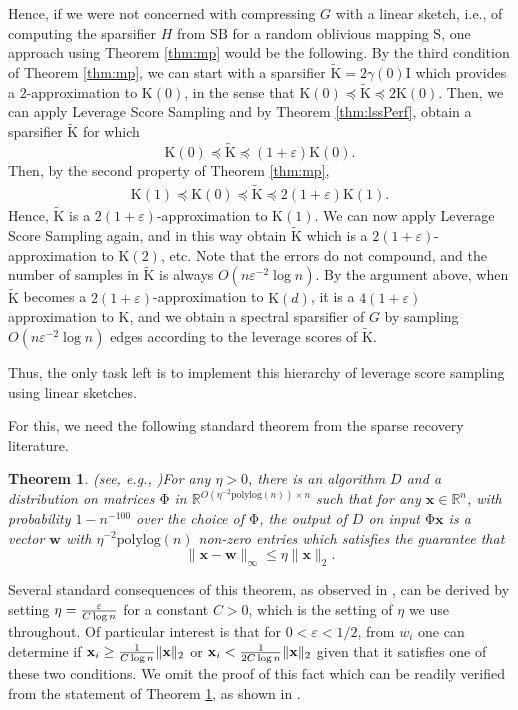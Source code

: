 \documentclass[11pt]{article}
\newtheorem{theorem}{Theorem}
\newcommand{\mat}[1]{{\ensuremath{\bm{\mathrm{#1}}}}}
\def\matB{\mat{B}}
\def\matI{\mat{I}}
\def\matK{\mat{K}}
\def\matS{\mat{S}}
\def\w{{\mathbf{w}}}
\def\frac#1#2{{#1\over #2}}
\def\x{{\mathbf x}}
\newcommand{\eps}{\varepsilon}
\newcommand{\polylog}{{\mathrm{polylog}}}
\begin{document}
Hence, if we were not concerned with compressing $G$ with a linear sketch, i.e., 
of computing the sparsifier $H$ from $\matS \matB$ for a random oblivious
mapping $\matS$, one approach using
Theorem \ref{thm:mp} would be the following. By the third condition of Theorem \ref{thm:mp}, 
we can start with a sparsifier $\tilde{\matK} = 2 \gamma(0)\matI$ which provides a $2$-approximation to $\matK(0)$, 
in the sense that $\matK(0) \preceq \tilde{\matK} \preceq 2\matK(0)$. Then, we can apply Leverage Score Sampling
and by Theorem \ref{thm:lssPerf}, obtain a sparsifier $\tilde{\matK}$ for which 
$$\matK(0) \preceq \tilde{\matK} \preceq (1+\eps)\matK(0).$$
Then, by the second property of Theorem \ref{thm:mp}, 
\begin{eqnarray*}
\matK(1) \preceq \matK(0) \preceq \tilde{\matK} \preceq 2(1+\eps)\matK(1).
\end{eqnarray*}
Hence, $\tilde{\matK}$ is a $2(1+\eps)$-approximation to $\matK(1)$. We can now apply Leverage Score Sampling
again, and in this way obtain $\tilde{\matK}$ which is a $2(1+\eps)$-approximation to $\matK(2)$, etc. Note that
the errors do not compound, and the number of samples in $\tilde{\matK}$ is always $O(n \eps^{-2} \log n)$. By
the argument above, when $\tilde{\matK}$ becomes a $2(1+\eps)$-approximation to $\matK(d)$, it is a $4(1+\eps)$
approximation to $\matK$, and we obtain a spectral sparsifier of $G$ by sampling $O(n \eps^{-2} \log n)$ edges
according to the leverage scores of $\tilde{\matK}$. 

Thus, the only task left is to implement this hierarchy of leverage score sampling using linear sketches. 

For this, we need the following standard theorem from the sparse recovery literature. 
\begin{theorem}(see, e.g., \cite{ccf04,GLPS})\label{thm:hh}
For any $\eta > 0$, there is an algorithm $D$ and a 
distribution on matrices $\mat\Phi$ in $\mathbb{R}^{O(\eta^{-2} \polylog(n)) \times n}$
such that for any $\x \in \mathbb{R}^n$, with probability $1-n^{-100}$ over the choice of $\mat\Phi$, the output of
$D$ on input $\mat\Phi \x$ is a vector $\w$ with $\eta^{-2} \polylog(n)$ non-zero entries which satisfies the 
guarantee that 
$$\|\x-\w\|_{\infty} \leq \eta \|\x\|_2.$$
\end{theorem}
Several standard consequences of this theorem, as observed in \cite{KLMMS14}, 
can be derived by setting $\eta = \frac{\eps}{C \log n}$ for a constant $C > 0$, which is the setting of $\eta$
we use throughout.  
Of particular interest is that for $0 < \eps < 1/2$, from $w_i$ one can determine
if $\x_i \geq \frac{1}{C \log n} \|\x\|_2$ or $\x_i < \frac{1}{2C \log n} \|\x\|_2$ given that it satisfies one of 
these two conditions. We omit the proof of this fact which can be readily verified from the statement
of Theorem \ref{thm:hh}, as shown in \cite{KLMMS14}. 
\end{document}
